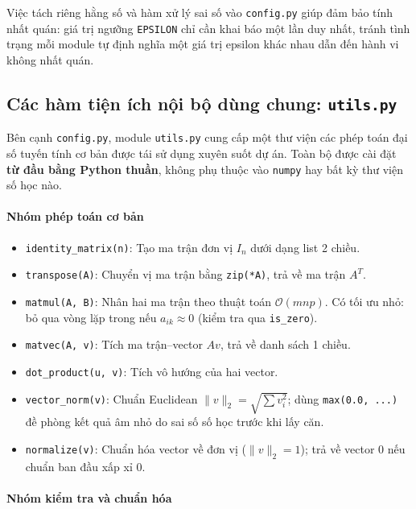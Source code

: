 Việc tách riêng hằng số và hàm xử lý sai số vào \texttt{config.py} giúp đảm bảo tính nhất quán: giá trị ngưỡng \texttt{EPSILON} chỉ cần khai báo một lần duy nhất, tránh tình trạng mỗi module tự định nghĩa một giá trị epsilon khác nhau dẫn đến hành vi không nhất quán.

\subsection{Các hàm tiện ích nội bộ dùng chung: \texttt{utils.py}}

Bên cạnh \texttt{config.py}, module \texttt{utils.py} cung cấp một thư viện các phép toán đại số tuyến tính cơ bản được tái sử dụng xuyên suốt dự án. Toàn bộ được cài đặt \textbf{từ đầu bằng Python thuần}, không phụ thuộc vào \texttt{numpy} hay bất kỳ thư viện số học nào.

\paragraph{Nhóm phép toán cơ bản}

\begin{itemize}
    \item \texttt{identity\_matrix(n)}: Tạo ma trận đơn vị $I_n$ dưới dạng list 2 chiều.
    \item \texttt{transpose(A)}: Chuyển vị ma trận bằng \texttt{zip(*A)}, trả về ma trận $A^T$.
    \item \texttt{matmul(A, B)}: Nhân hai ma trận theo thuật toán $\mathcal{O}(mnp)$. Có tối ưu nhỏ: bỏ qua vòng lặp trong nếu $a_{ik} \approx 0$ (kiểm tra qua \texttt{is\_zero}).
    \item \texttt{matvec(A, v)}: Tích ma trận--vector $Av$, trả về danh sách 1 chiều.
    \item \texttt{dot\_product(u, v)}: Tích vô hướng của hai vector.
    \item \texttt{vector\_norm(v)}: Chuẩn Euclidean $\|v\|_2 = \sqrt{\sum v_i^2}$; dùng \texttt{max(0.0, ...)} đề phòng kết quả âm nhỏ do sai số số học trước khi lấy căn.
    \item \texttt{normalize(v)}: Chuẩn hóa vector về đơn vị ($\|v\|_2 = 1$); trả về vector 0 nếu chuẩn ban đầu xấp xỉ 0.
\end{itemize}

\paragraph{Nhóm kiểm tra và chuẩn hóa}

